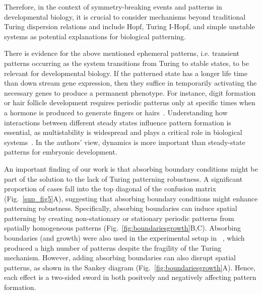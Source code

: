 Therefore, in the context of symmetry-breaking events and patterns in developmental biology, it is crucial to consider mechanisms beyond traditional Turing dispersion relations and include Hopf, Turing I-Hopf, and simple unstable systems as potential explanations for biological patterning.


There is evidence for the above mentioned ephemeral patterns, i.e. transient patterns occurring as the system transitions from Turing to stable states, to be relevant for developmental biology. If the patterned state has a longer life time than down stream gene expression, then they suffice in temporarily activating the necessary genes to produce a permanent phenotype.
For instance, digit formation or hair follicle development requires periodic patterns only at specific times when a hormone is produced to generate fingers or hairs~\parencite{raspopovic2014digit,glover2023developmental}. 
Understanding how interactions between different steady states influence pattern formation is essential, as multistability is widespread and plays a critical role in biological systems~\parencite{laurent1999multistability}. In the authors' view, dynamics is more important than steady-state patterns for embryonic development.


An important finding of our work is that absorbing boundary conditions might be part of the solution to the lack of Turing patterning robustness. A significant proportion of cases fall into the top diagonal of the confusion matrix (Fig.~\ref{sup_fig5}A), suggesting that absorbing boundary conditions might enhance patterning robustness.
Specifically, absorbing boundaries can induce spatial patterning by creating non-stationary or stationary periodic patterns from spatially homogeneous patterns (Fig.~\ref{fig:boundariesgrowth}B,C). Absorbing boundaries (and growth) were also used in the experimental setup in ~\parencite{Oliver2023}, which produced a high number of patterns despite the fragility of the Turing mechanism. However, adding absorbing boundaries can also disrupt spatial patterns, as shown in the Sankey diagram (Fig.~\ref{fig:boundariesgrowth}A). Hence, each effect is a two-sided sword in both positvely and negatively affecting pattern formation.

